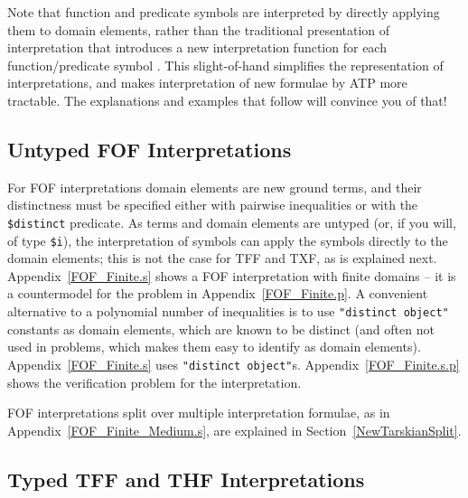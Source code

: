 \documentclass{easychair}
\begin{document}
Note that function and predicate symbols are interpreted by directly applying them to domain
elements, rather than the traditional presentation of interpretation that introduces a new
interpretation function for each function/predicate symbol \cite[p.999]{Gal15}.
This slight-of-hand simplifies the representation of interpretations, and makes interpretation
of new formulae by ATP more tractable.
The explanations and examples that follow will convince you of that!

\subsection{Untyped FOF Interpretations}
\label{NewTarskianFOF}

For FOF interpretations domain elements are new ground terms, and their distinctness must be 
specified either with pairwise inequalities or with the {\tt \$distinct} predicate.
As terms and domain elements are untyped (or, if you will, of type {\tt \$i}), the interpretation
of symbols can apply the symbols directly to the domain elements; this is not the case for
TFF and TXF, as is explained next.
Appendix~\ref{FOF_Finite.s} shows a FOF interpretation with finite domains -- it is a 
countermodel for the problem in Appendix~\ref{FOF_Finite.p}.
A convenient alternative to a polynomial number of inequalities is to use {\tt "distinct object"} 
constants as domain elements, which are known to be distinct (and often not used in problems, 
which makes them easy to identify as domain elements).
Appendix~\ref{FOF_Finite.s} uses {\tt "distinct object"}s.
Appendix~\ref{FOF_Finite.s.p} shows the verification problem for the interpretation.

FOF interpretations split over multiple interpretation formulae, as in 
Appendix~\ref{FOF_Finite_Medium.s}, are explained in Section~\ref{NewTarskianSplit}.

\subsection{Typed TFF and THF Interpretations}
\label{NewTarskianTFFTHF}
\end{document}
